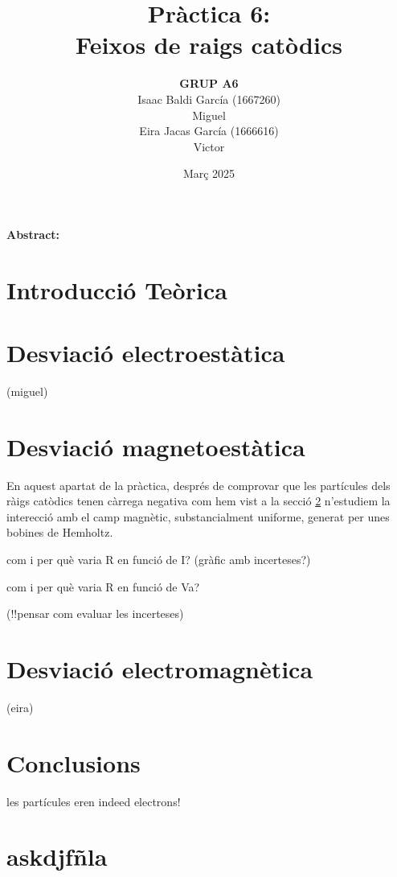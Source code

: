 \documentclass[11pt]{article}
\title{\Huge\bfseries Pràctica 6: \\ Feixos de raigs catòdics \\ [2ex] \Large}
\author{\begin{tabular}{c}
\textbf{GRUP A6} \\
Isaac Baldi García (1667260)\\
Miguel \\
Eira Jacas García (1666616) \\
Victor
\end{tabular}}
\date{Març 2025}
\begin{document}
\maketitle
\begin{center}
    \textbf{Abstract:} 
\end{center}


\newpage

\tableofcontents
\newpage

\section{Introducció Teòrica}
\section{Desviació electroestàtica}\label{sec: desv_electr}
(miguel)
\section{Desviació magnetoestàtica}
En aquest apartat de la pràctica, després de comprovar que les partícules dels ràigs catòdics tenen càrrega negativa com hem vist a la secció \ref{sec: desv_electr} n'estudiem la interecció amb el camp magnètic, substancialment uniforme, generat per unes bobines de Hemholtz.

com i per què varia R en funció de I?
(gràfic amb incerteses?)

com i per què varia R en funció de Va?

(!!pensar com evaluar les incerteses)
\section{Desviació electromagnètica}
(eira)
\section{Conclusions}
les partícules eren indeed electrons!

\section{askdjfñla}
\end{document}
